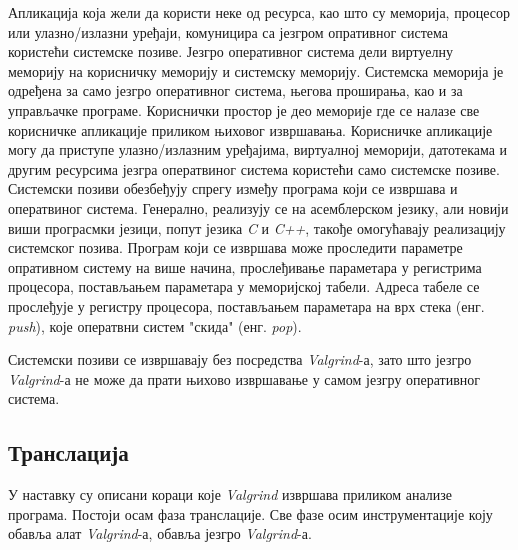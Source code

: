 \documentclass[12pt,oneside]{memoir}
\begin{document}
\indent Апликација која жели да користи неке од ресурса, као што су меморија, процесор или улазно/излазни уређаји, комуницира са језгром опративног система користећи системске позиве. Језгро оперативног система дели виртуелну меморију на корисничку меморију и системску меморију. Системска меморија је одређена за само језгро оперативног система, његова проширања, као и за управљачке програме. Кориснички простор је део меморије где се налазе све корисничке апликације приликом њиховог извршавања. Корисничке апликације могу да приступе улазно/излазним уређајима, виртуалној меморији, датотекама и другим ресурсима језгра оператвиног система користећи само системске позиве. Системски позиви обезбеђују спрегу између програма који се извршава и оператвиног система. Генерално, реализују се на асемблерском језику, али новији виши програсмки језици, попут језика \textit{C} и \textit{C++}, такође омогућавају реализацију системског позива. Програм који се извршава може проследити параметре опративном систему на више начина, прослеђивање параметара у регистрима процесора, постављањем параметара у меморијској табели. Aдреса табеле се прослеђује у регистру процесора, постављањем параметара на врх стека (енг. \textit{push}), које оператвни систем "скида" (енг. \textit{pop}).

\indent Системски позиви се извршавају без посредства \textit{Valgrind}-а, зато што језгро \textit{Valgrind}-а не може да прати њихово извршавање у самом језгру оперативног система.


\subsection{Транслација}

\indent У наставку су описани кораци које \textit{Valgrind} извршава приликом анализе програма. Постоји осам фаза транслације. Све фазе осим инструментације коју обавља алат \textit{Valgrind}-а, обавља језгро \textit{Valgrind}-а.
\end{document}

